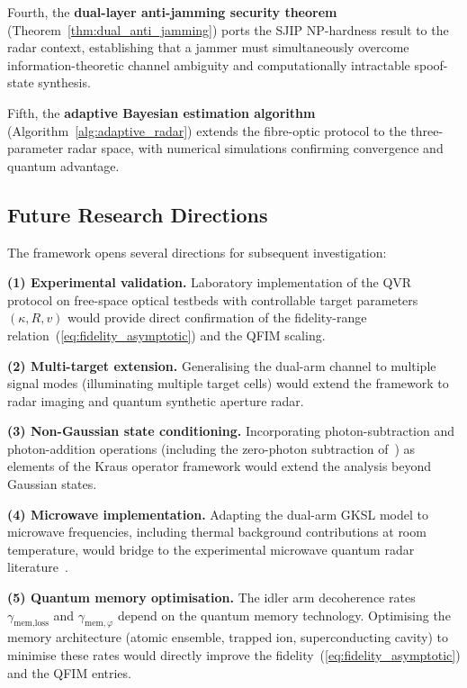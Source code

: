 \documentclass[journal]{IEEEtran}
\begin{document}
Fourth, the \textbf{dual-layer anti-jamming security theorem} (Theorem~\ref{thm:dual_anti_jamming}) ports the SJIP NP-hardness result to the radar context, establishing that a jammer must simultaneously overcome information-theoretic channel ambiguity and computationally intractable spoof-state synthesis.

Fifth, the \textbf{adaptive Bayesian estimation algorithm} (Algorithm~\ref{alg:adaptive_radar}) extends the fibre-optic protocol to the three-parameter radar space, with numerical simulations confirming convergence and quantum advantage.

\subsection{Future Research Directions}

The framework opens several directions for subsequent investigation:

\textbf{(1) Experimental validation.} Laboratory implementation of the QVR protocol on free-space optical testbeds with controllable target parameters $(\kappa, R, v)$ would provide direct confirmation of the fidelity-range relation~(\ref{eq:fidelity_asymptotic}) and the QFIM scaling.

\textbf{(2) Multi-target extension.} Generalising the dual-arm channel to multiple signal modes (illuminating multiple target cells) would extend the framework to radar imaging and quantum synthetic aperture radar.

\textbf{(3) Non-Gaussian state conditioning.} Incorporating photon-subtraction and photon-addition operations (including the zero-photon subtraction of~\cite{zhao2025quantum}) as elements of the Kraus operator framework would extend the analysis beyond Gaussian states.

\textbf{(4) Microwave implementation.} Adapting the dual-arm GKSL model to microwave frequencies, including thermal background contributions at room temperature, would bridge to the experimental microwave quantum radar literature~\cite{barzanjeh2015microwave,chang2019quantum}.

\textbf{(5) Quantum memory optimisation.} The idler arm decoherence rates $\gamma_{\text{mem,loss}}$ and $\gamma_{\text{mem},\varphi}$ depend on the quantum memory technology. Optimising the memory architecture (atomic ensemble, trapped ion, superconducting cavity) to minimise these rates would directly improve the fidelity~(\ref{eq:fidelity_asymptotic}) and the QFIM entries.
\end{document}
